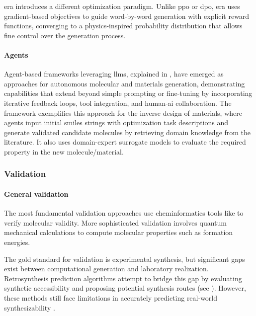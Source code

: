 \gls{era} introduces a different optimization paradigm. \autocite{chennakesavalu2025aligning} Unlike \gls{ppo} or \gls{dpo}, \gls{era} uses gradient-based objectives to guide word-by-word generation with explicit reward functions, converging to a physics-inspired probability distribution that allows fine control over the generation process.

\paragraph{Agents} Agent-based frameworks leveraging \glspl{llm},  explained in , have emerged as approaches for autonomous molecular and materials generation, demonstrating capabilities that extend beyond simple prompting or fine-tuning by incorporating iterative feedback loops, tool integration, and human-\gls{ai} collaboration. 
The  framework exemplifies this approach for the inverse design of materials, where agents input initial \gls{smiles} strings with optimization task descriptions and generate validated candidate molecules by retrieving domain knowledge from the literature.\autocite{ansari2024dziner} 
It also uses domain-expert surrogate models to evaluate the required property in the new molecule/material. 

\subsubsection{Validation}
\paragraph{General validation} The most fundamental validation approaches use cheminformatics tools like  to verify molecular validity. More sophisticated validation involves quantum mechanical calculations to compute molecular properties such as formation energies\autocite{kingsbury2022flexible}. 

The gold standard for validation is experimental synthesis, but significant gaps exist between computational generation and laboratory realization.
Retrosynthesis prediction algorithms attempt to bridge this gap by evaluating synthetic accessibility and proposing potential synthesis routes (see ). 
However, these methods still face limitations in accurately predicting real-world synthesizability \autocite{zunger2019beware}.

